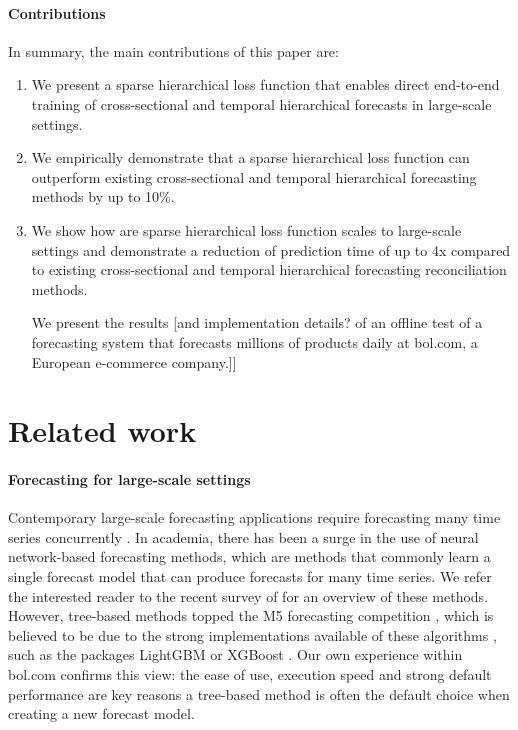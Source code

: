 \documentclass[preprint, 3p, times, twocolumn]{elsarticle}
\begin{document}
\paragraph{Contributions} In summary, the main contributions of this paper are:
\begin{enumerate}
  \item We present a sparse hierarchical loss function that enables direct end-to-end training of cross-sectional and temporal hierarchical forecasts in large-scale settings.
  \item We empirically demonstrate that a sparse hierarchical loss function can outperform existing cross-sectional and temporal hierarchical forecasting methods by up to 10\%.
  \item We show how are sparse hierarchical loss function scales to large-scale settings and demonstrate a reduction of prediction time of up to 4x compared to existing cross-sectional and temporal hierarchical forecasting reconciliation methods.
  \item [We present the results [and implementation details?] of an offline test of a forecasting system that forecasts millions of products daily at bol.com, a European e-commerce company.]]
\end{enumerate}

\section{Related work} \label{sec:relwork}

\paragraph{Forecasting for large-scale settings} Contemporary large-scale forecasting applications require forecasting many time series concurrently \cite{bose_probabilistic_2017}. In academia, there has been a surge in the use of neural network-based forecasting methods, which are methods that commonly learn a single forecast model that can produce forecasts for many time series. We refer the interested reader to the recent survey of \citet{benidis_deep_2023} for an overview of these methods. However, tree-based methods topped the M5 forecasting competition \cite{makridakis_m5_2022}, which is believed to be due to the strong implementations available of these algorithms \cite{januschowski_forecasting_2022}, such as the packages LightGBM \cite{ke_lightgbm_2017} or XGBoost \cite{chen_xgboost_2016}. Our own experience within bol.com confirms this view: the ease of use, execution speed and strong default performance are key reasons a tree-based method is often the default choice when creating a new forecast model.
\end{document}
